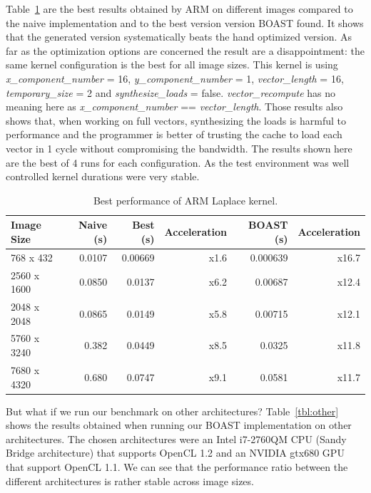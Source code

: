\documentclass[11pt, a4paper, twoside]{montblanc}
\begin{document}
Table~\ref{tbl:ARM} are the best results obtained by ARM on different images
compared to the naive implementation and to the best version version BOAST
found. It shows that the generated version systematically beats the hand
optimized version. As far as the optimization options are concerned the result
are a disappointment: the same kernel configuration is the best for all image
sizes. This kernel is using \textit{x\_component\_number} = 16,
\textit{y\_component\_number} = 1, \textit{vector\_length} = 16,
\textit{temporary\_size} = 2 and \textit{synthesize\_loads} = false.
\textit{vector\_recompute} has no meaning here as \textit{x\_component\_number}
== \textit{vector\_length}. Those results also shows that, when working on full
vectors, synthesizing the loads is harmful to performance and the programmer is
better of trusting the cache to load each vector in 1 cycle without
compromising the bandwidth. The results shown here are the best of 4 runs for
each configuration. As the test environment was well controlled kernel
durations were very stable.

\begin{table}
\centering
\begin{tabular}{|l|r|r|r|r|r|}
\hline
Image Size  & Naive (s) & Best (s) & Acceleration & BOAST (s) & Acceleration \\
\hline
768 x 432   & 0.0107    & 0.00669  & x1.6         & 0.000639  & x16.7 \\
\hline
2560 x 1600 & 0.0850    & 0.0137   & x6.2         & 0.00687   & x12.4 \\
\hline
2048 x 2048 & 0.0865    & 0.0149   & x5.8         & 0.00715   & x12.1 \\
\hline
5760 x 3240 & 0.382     & 0.0449   & x8.5         & 0.0325    & x11.8 \\
\hline
7680 x 4320 & 0.680     & 0.0747   & x9.1         & 0.0581    & x11.7 \\
\hline
\end{tabular}
\caption{Best performance of ARM Laplace kernel.}
\label{tbl:ARM}
\end{table}

But what if we run our benchmark on other architectures? Table~\ref{tbl:other}
shows the results obtained when running our BOAST implementation on other
architectures. The chosen architectures were an Intel i7-2760QM CPU (Sandy
Bridge architecture) that supports OpenCL 1.2 and an NVIDIA gtx680 GPU that
support OpenCL 1.1. We can see that the performance ratio between the different
architectures is rather stable across image sizes.
\end{document}
